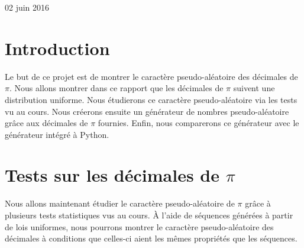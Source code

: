 \documentclass[a4paper,10pt]{article}
\begin{document}
\begin{titlepage}

{\large 02 juin 2016}\\[3cm] %


 

\vfill %

\end{titlepage}

\newpage
\tableofcontents
\newpage

\section{Introduction}
Le but de ce projet est de montrer le caractère pseudo-aléatoire des décimales de $\pi$. Nous allons montrer dans ce rapport que les 
décimales de $\pi$ suivent une distribution uniforme. Nous étudierons ce caractère pseudo-aléatoire via les tests vu au cours. Nous
créerons ensuite un générateur de nombres pseudo-aléatoire grâce aux décimales de $\pi$ fournies. Enfin, nous comparerons ce générateur
avec le générateur intégré à Python.

\section{Tests sur les décimales de $\pi$}

Nous allons maintenant étudier le caractère pseudo-aléatoire de $\pi$ grâce à plusieurs tests statistiques vus au cours. \`A l'aide de séquences générées à partir de lois uniformes, nous pourrons montrer le caractère pseudo-aléatoire des décimales à conditions que celles-ci aient les mêmes propriétés que les séquences.
\end{document}
